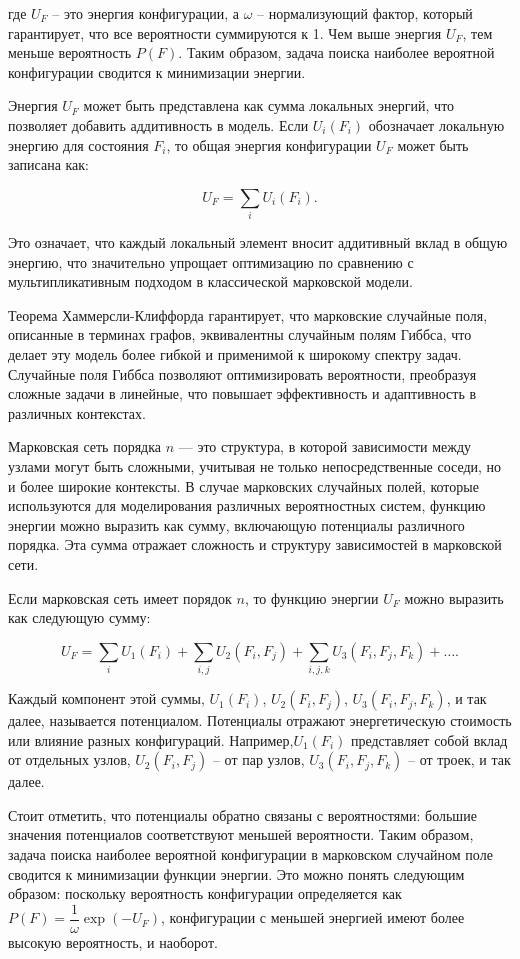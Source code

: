 где $U_F$ -- это энергия конфигурации, а $\omega$ -- нормализующий фактор, который гарантирует, что все вероятности суммируются к 1. Чем выше энергия $U_F$, тем меньше вероятность $P(F)$. Таким образом, задача поиска наиболее вероятной конфигурации сводится к минимизации энергии.

Энергия $U_F$ может быть представлена как сумма локальных энергий, что позволяет добавить аддитивность в модель. Если $U_i(F_i)$ обозначает локальную энергию для состояния $F_i$, то общая энергия конфигурации $U_F$ может быть записана как:

$$U_F = \sum\limits_i U_i (F_i).$$

Это означает, что каждый локальный элемент вносит аддитивный вклад в общую энергию, что значительно упрощает оптимизацию по сравнению с мультипликативным подходом в классической марковской модели.

Теорема Хаммерсли-Клиффорда гарантирует, что марковские случайные поля, описанные в терминах графов, эквивалентны случайным полям Гиббса, что делает эту модель более гибкой и применимой к широкому спектру задач. Случайные поля Гиббса позволяют оптимизировать вероятности, преобразуя сложные задачи в линейные, что повышает эффективность и адаптивность в различных контекстах.


Марковская сеть порядка $n$ — это структура, в которой зависимости между узлами могут быть сложными, учитывая не только непосредственные соседи, но и более широкие контексты. В случае марковских случайных полей, которые используются для моделирования различных вероятностных систем, функцию энергии можно выразить как сумму, включающую потенциалы различного порядка. Эта сумма отражает сложность и структуру зависимостей в марковской сети.

Если марковская сеть имеет порядок $n$, то функцию энергии $U_F$ можно выразить как следующую сумму:

$$U_F = \sum\limits_i U_1 (F_i) + \sum\limits_{i,j} U_2 (F_i, F_j) + \sum\limits_{i,j,k} U_3 (F_i, F_j, F_k) + \ldots.$$

Каждый компонент этой суммы, $U_1 (F_i)$, $U_2 (F_i, F_j)$, $U_3 (F_i, F_j, F_k)$, и так далее, называется потенциалом. Потенциалы отражают энергетическую стоимость или влияние разных конфигураций. Например,$U_1 (F_i)$ представляет собой вклад от отдельных узлов, $U_2 (F_i, F_j)$ -- от пар узлов, $U_3 (F_i, F_j, F_k)$ -- от троек, и так далее.

Стоит отметить, что потенциалы обратно связаны с вероятностями: большие значения потенциалов соответствуют меньшей вероятности. Таким образом, задача поиска наиболее вероятной конфигурации в марковском случайном поле сводится к минимизации функции энергии. Это можно понять следующим образом: поскольку вероятность конфигурации определяется как $P(F) = \dfrac{1}{\omega} \exp(-U_F)$, конфигурации с меньшей энергией имеют более высокую вероятность, и наоборот.

